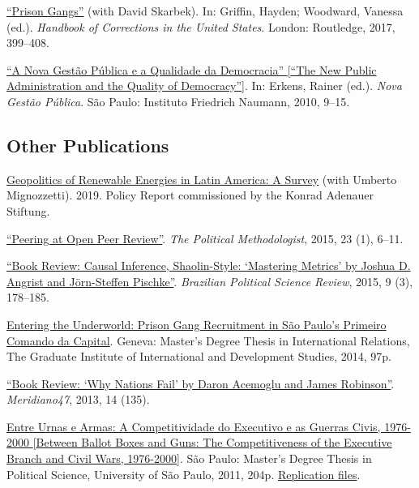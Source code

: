 \documentclass[a4paper]{article}
\renewenvironment{itemize}{
	\begin{list}{}{
			\setlength{\leftmargin}{1.5em}
		}
		}{
	\end{list}
}
\begin{document}
\begin{itemize}
\item \href{https://osf.io/kuqqx/}{``Prison Gangs''} (with David Skarbek). In: Griffin, Hayden; Woodward, Vanessa (ed.). \textit{Handbook of Corrections in the United States}. London: Routledge, 2017, 399--408.
\item \href{https://fnst.org/sites/default/files/uploads/2017/12/08/ngp.pdf}{``A Nova Gest\~{a}o P\'{u}blica e a Qualidade da Democracia'' {[}``The New Public Administration and the Quality of Democracy''{]}}. In: Erkens, Rainer (ed.). \textit{Nova Gest\~{a}o P\'{u}blica}. S\~{a}o Paulo: Instituto Friedrich Naumann, 2010, 9--15.
\end{itemize}

\subsection*{Other Publications}

\begin{itemize}
\item \href{https://www.kas.de/documents/273477/273526/Geopolitics+of+Renewable+Energy+in+Latin+America+-+A+Survey.pdf/9fe39ef1-6028-0836-90b0-aada31cb6769?version=1.0&t=1551887777018}{Geopolitics of Renewable Energies in Latin America: A Survey} (with Umberto Mignozzetti). 2019. Policy Report commissioned by the Konrad Adenauer Stiftung.
\item \href{https://thepoliticalmethodologist.files.wordpress.com/2016/02/tpm_v23_n1.pdf}{``Peering at Open Peer Review''}. \textit{The Political Methodologist}, 2015, 23 (1), 6--11.
\item \href{http://www.scielo.br/readcube/epdf.php?doi=10.1590/1981-38212015000300026&pid=S1981-38212015000300178&pdf_path=bpsr/v9n3/1981-3821-bpsr-9-3-0178.pdf&lang=en}{``Book Review: Causal Inference, Shaolin-Style: `Mastering Metrics' by Joshua D. Angrist and J\"{o}rn-Steffen Pischke''}. \textit{Brazilian Political Science Review}, 2015, 9 (3), 178--185.
\item \href{http://dx.doi.org/10.6084/m9.figshare.1209203}{Entering the Underworld: Prison Gang Recruitment in S\~{a}o Paulo's Primeiro Comando da Capital}. Geneva: Master's Degree Thesis in International Relations, The Graduate Institute of International and Development Studies, 2014, 97p.
\item \href{http://seer.bce.unb.br/index.php/MED/article/view/7505/6497}{``Book Review: `Why Nations Fail' by Daron Acemoglu and James Robinson''}. \textit{Meridiano47}, 2013, 14 (135).
\item \href{http://dx.doi.org/10.6084/m9.figshare.963082}{Entre Urnas e Armas: A Competitividade do Executivo e as Guerras Civis, 1976-2000 {[}Between Ballot Boxes and Guns: The Competitiveness of the Executive Branch and Civil Wars, 1976-2000{]}}. S\~{a}o Paulo: Master's Degree Thesis in Political Science, University of S\~{a}o Paulo, 2011, 204p. \href{http://dx.doi.org/10.6084/m9.figshare.963183}{Replication files}.
\end{itemize}
\end{document}

